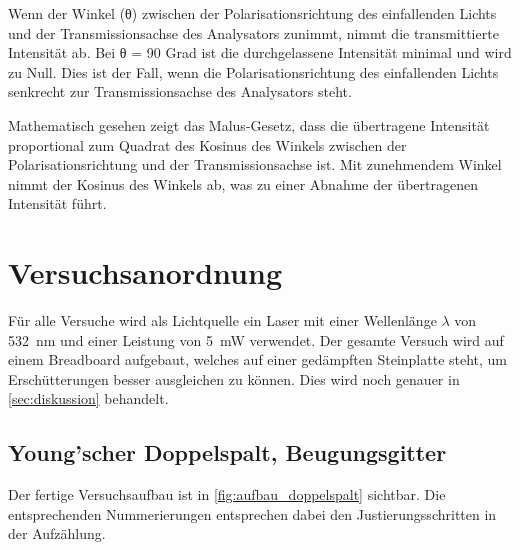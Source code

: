 \documentclass[12pt,english,ngerman]{scrartcl}
\begin{document}
Wenn der Winkel (θ) zwischen der Polarisationsrichtung des einfallenden Lichts
und der Transmissionsachse des Analysators zunimmt, nimmt die transmittierte
Intensität ab. Bei θ = 90 Grad ist die durchgelassene Intensität minimal und
wird zu Null. Dies ist der Fall, wenn die Polarisationsrichtung des
einfallenden Lichts senkrecht zur Transmissionsachse des Analysators steht.

Mathematisch gesehen zeigt das Malus-Gesetz, dass die übertragene Intensität
proportional zum Quadrat des Kosinus des Winkels zwischen der
Polarisationsrichtung und der Transmissionsachse ist. Mit zunehmendem Winkel
nimmt der Kosinus des Winkels ab, was zu einer Abnahme der übertragenen
Intensität führt.





\section{Versuchsanordnung}\label{sec:versuchsanordnung}

Für alle Versuche wird als Lichtquelle ein Laser mit einer Wellenlänge $\lambda$ von \SI{532}{\nano\meter} und einer 
Leistung von \SI{5}{\milli\watt} verwendet. Der gesamte Versuch wird auf einem Breadboard aufgebaut, welches auf einer 
gedämpften Steinplatte steht, um Erschütterungen besser ausgleichen zu können. Dies wird noch genauer in \autoref{sec:diskussion}
behandelt.
\subsection{Young'scher Doppelspalt, Beugungsgitter}

Der fertige Versuchsaufbau ist in \autoref{fig:aufbau_doppelspalt} sichtbar. Die entsprechenden Nummerierungen entsprechen dabei den 
Justierungsschritten in der Aufzählung.
\end{document}
